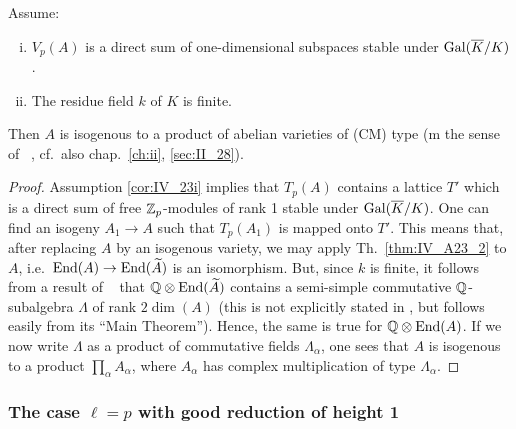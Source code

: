 \begin{subappendices}
\begin{corl}
	Assume:
	\begin{enumerate}[(i)]
		\item\label{cor:IV_23i}
			$V_p(A)$ is a direct sum of one-dimensional subspaces
			stable under $\operatorname{Gal}(\overline{K}/K)$.
		\item\label{cor:IV_23ii}
			The residue field $k$ of $K$ is finite.
	\end{enumerate}
	Then $A$ is isogenous to a product of abelian varieties of (CM) type (m
	the sense of \citeauthor{34}~\cite{34}, cf.\ also chap.~\ref{ch:ii},
	\ref{sec:II_28}).
\end{corl}
\begin{proof}
	Assumption \ref{cor:IV_23i} implies that $T_p(A)$ contains a lattice
	$T'$ which is a direct sum of free $\mathbb{Z}_p$-modules of rank 1 stable
	under $\operatorname{Gal}(\overline{K}/K)$. One can find an isogeny $A_1 \to A$ such that
	$T_p(A_1)$ is mapped onto $T'$. This means that, after replacing $A$ by
	an isogenous variety, we may apply Th.~\ref{thm:IV_A23_2} to $A$, i.e.\
	$\operatorname{End}(A) \to \operatorname{End}(\widetilde A)$ is an isomorphism. But, since $k$ is
	finite, it follows from a result of \citeauthor{38}~\cite{38} that $\mathbb{Q}
	\otimes \operatorname{End}(\widetilde A)$ contains a semi-simple commutative\break
	$\mathbb{Q}$-subalgebra $\Lambda$ of rank $2 \dim(A)$ (this is not explicitly
	stated in \cite{38}, but follows easily from its ``Main Theorem'').
	Hence, the same is true for $\mathbb{Q} \otimes \operatorname{End}(A)$. If we now write
	$\Lambda$ as a product of commutative fields $\Lambda_\alpha$, one sees
	that $A$ is isogenous to a product $\prod_{\alpha} A_\alpha$, where
	$A_\alpha$ has complex multiplication of type $\Lambda_\alpha$.
\end{proof}

\subsubsection{The case \texorpdfstring{$\ell = p$}{ℓ = p} with good reduction
of height 1}
\label{sec:IV_A24}

\end{subappendices}
